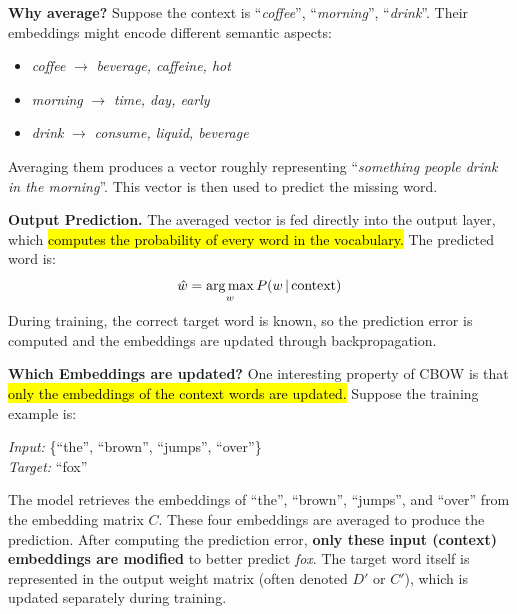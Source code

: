 \newpage

\noindent
\textcolor{Green3}{ \textbf{Why average?}} Suppose the context is ``\emph{coffee}'', ``\emph{morning}'', ``\emph{drink}''. Their embeddings might encode different semantic aspects:
\begin{itemize}
    \item \emph{coffee} $\rightarrow$ \emph{beverage, caffeine, hot}
    \item \emph{morning} $\rightarrow$ \emph{time, day, early}
    \item \emph{drink} $\rightarrow$ \emph{consume, liquid, beverage}
\end{itemize}
Averaging them produces a vector roughly representing ``\emph{something people drink in the morning}''. This vector is then used to predict the missing word.

\highspace
\textcolor{Green3}{ \textbf{Output Prediction.}} The averaged vector is fed directly into the output layer, which \hl{computes the probability of every word in the vocabulary.} The predicted word is:
\begin{equation*}
    \hat{w} = \operatorname*{arg\,max}_{w} P(w \, | \, \text{context})
\end{equation*}
During training, the correct target word is known, so the prediction error is computed and the embeddings are updated through backpropagation.

\highspace
\textcolor{Green3}{ \textbf{Which Embeddings are updated?}} One interesting property of CBOW is that \hl{only the embeddings of the context words are updated.} Suppose the training example is:
\begin{center}
    \emph{Input:} \{``the'', ``brown'', ``jumps'', ``over''\} \\
    \emph{Target:} ``fox''
\end{center}

\noindent
The model retrieves the embeddings of ``the'', ``brown'', ``jumps'', and ``over'' from the embedding matrix $C$. These four embeddings are averaged to produce the prediction. After computing the prediction error, \textbf{only these input (context) embeddings are modified} to better predict \emph{fox}. The target word itself is represented in the output weight matrix (often denoted $D'$ or $C'$), which is updated separately during training.

